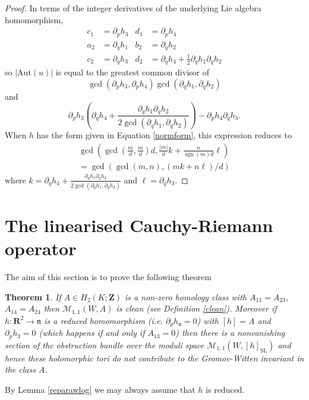 \documentclass[11pt]{amsart}
\newcommand{\mM}{\mathcal{M}}
\newcommand{\RR}{\mathbf{R}}
\newcommand{\ZZ}{\mathbf{Z}}
\newcommand{\Aut}{\mathrm{Aut}}
\newcommand{\WW}{W}
\newcommand{\nn}{\mathfrak{n}}
\renewcommand{\aa}{\mathfrak{a}}
\newcommand{\OP}{\operatorname}
\numberwithin{equation}{section}
\newtheorem{thm}[equation]{Theorem}
\theoremstyle{definition}
\theoremstyle{remark}
\begin{document}
\begin{proof}
In terms of the integer derivatives of the underlying Lie algebra homomorphism,
\begin{align*}
c_1&=\partial_ph_3 & d_1&=\partial_ph_4\\
a_2&=\partial_qh_1 & b_2&=\partial_qh_2\\
c_2&=\partial_qh_3 & d_2&=\partial_qh_4+\frac{1}{2}\partial_qh_1\partial_qh_2
\end{align*}
so $|\Aut(u)|$ is equal to the greatest common divisor of
\[\gcd(\partial_ph_3,\partial_ph_4)\gcd(\partial_qh_1,\partial_qh_2)\]
and
\[\partial_ph_3\left(\partial_qh_4+\frac{\partial_qh_1\partial_qh_2}{2\gcd(\partial_qh_1,\partial_qh_2)}\right)-\partial_ph_4\partial_qh_3.\]
When $h$ has the form given in Equation \eqref{normform}, this expression reduces to
\begin{gather*}\gcd\left(\gcd\left(\frac{m}{d},\frac{m}{d}\right)d,\frac{|m|}{d}k+\frac{n}{\OP{sgn}(m)d}\ell\right)\\
=\gcd(\gcd(m,n),(mk+n\ell)/d)\end{gather*}
where $k=\partial_qh_4+\frac{\partial_qh_1\partial_qh_2}{2\gcd(\partial_qh_1,\partial_qh_2)}$ and $\ell=\partial_qh_3$.
\end{proof}


\section{The linearised Cauchy-Riemann operator}\label{lintheory}
The aim of this section is to prove the following theorem
\begin{thm}\label{cleanthm}
If $A\in H_2(K;\ZZ)$ is a non-zero homology class with $A_{13}=A_{23}$, $A_{14}=A_{24}$ then $\mM_{1,1}(\WW,A)$ is clean (see Definition \ref{clean}). Moreover if $h\colon\RR^2\to\nn$ is a reduced homomorphism (i.e. $\partial_ph_{\aa}=0$) with $[h]=A$ and $\partial_ph_3=0$ (which happens if and only if $A_{13}=0$) then there is a nonvanishing section of the obstruction bundle over the moduli space $\mM_{1,1}(\WW,[h]_{\OP{SL}})$ and hence these holomorphic tori do not contribute to the Gromov-Witten invariant in the class $A$.
\end{thm}
By Lemma \ref{reparawlog} we may always assume that $h$ is reduced.

\end{document}
